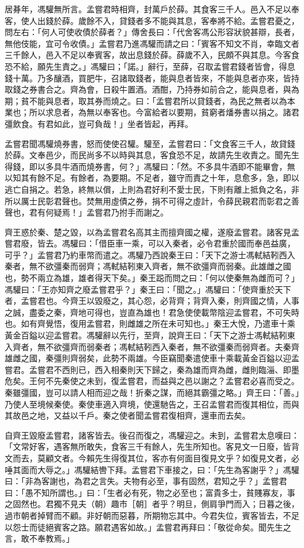 \begin{pinyinscope}
居朞年，馮驩無所言。孟嘗君時相齊，封萬戶於薛。其食客三千人。邑入不足以奉客，使人出錢於薛。歲餘不入，貸錢者多不能與其息，客奉將不給。孟嘗君憂之，問左右：「何人可使收債於薛者？」傳舍長曰：「代舍客馮公形容狀貌甚辯，長者，無他伎能，宜可令收債。」孟嘗君乃進馮驩而請之曰：「賓客不知文不肖，幸臨文者三千餘人，邑入不足以奉賓客，故出息錢於薛。薛歲不入，民頗不與其息。今客食恐不給，願先生責之。」馮驩曰；「諾。」辭行，至薛，召取孟嘗君錢者皆會，得息錢十萬。乃多釀酒，買肥牛，召諸取錢者，能與息者皆來，不能與息者亦來，皆持取錢之券書合之。齊為會，日殺牛置酒。酒酣，乃持券如前合之，能與息者，與為期；貧不能與息者，取其券而燒之。曰：「孟嘗君所以貸錢者，為民之無者以為本業也；所以求息者，為無以奉客也。今富給者以要期，貧窮者燔券書以捐之。諸君彊飲食。有君如此，豈可負哉！」坐者皆起，再拜。

孟嘗君聞馮驩燒券書，怒而使使召驩。驩至，孟嘗君曰：「文食客三千人，故貸錢於薛。文奉邑少，而民尚多不以時與其息，客食恐不足，故請先生收責之。聞先生得錢，即以多具牛酒而燒券書，何？」馮驩曰：「然。不多具牛酒即不能畢會，無以知其有餘不足。有餘者，為要期。不足者，雖守而責之十年，息愈多，急，即以逃亡自捐之。若急，終無以償，上則為君好利不愛士民，下則有離上抵負之名，非所以厲士民彰君聲也。焚無用虛債之券，捐不可得之虛計，令薛民親君而彰君之善聲也，君有何疑焉！」孟嘗君乃拊手而謝之。

齊王惑於秦、楚之毀，以為孟嘗君名高其主而擅齊國之權，遂廢孟嘗君。諸客見孟嘗君廢，皆去。馮驩曰：「借臣車一乘，可以入秦者，必令君重於國而奉邑益廣，可乎？」孟嘗君乃約車幣而遣之。馮驩乃西說秦王曰：「天下之游士馮軾結靷西入秦者，無不欲彊秦而弱齊；馮軾結靷東入齊者，無不欲彊齊而弱秦。此雄雌之國也，勢不兩立為雄，雄者得天下矣。」秦王跽而問之曰：「何以使秦無為雌而可？」馮驩曰：「王亦知齊之廢孟嘗君乎？」秦王曰：「聞之。」馮驩曰：「使齊重於天下者，孟嘗君也。今齊王以毀廢之，其心怨，必背齊；背齊入秦，則齊國之情，人事之誠，盡委之秦，齊地可得也，豈直為雄也！君急使使載幣陰迎孟嘗君，不可失時也。如有齊覺悟，復用孟嘗君，則雌雄之所在未可知也。」秦王大悅，乃遣車十乘黃金百鎰以迎孟嘗君。馮驩辭以先行，至齊，說齊王曰：「天下之游士馮軾結靷東入齊者，無不欲彊齊而弱秦者；馮軾結靷西入秦者，無不欲彊秦而弱齊者。夫秦齊雄雌之國，秦彊則齊弱矣，此勢不兩雄。今臣竊聞秦遣使車十乘載黃金百鎰以迎孟嘗君。孟嘗君不西則已，西入相秦則天下歸之，秦為雄而齊為雌，雌則臨淄、即墨危矣。王何不先秦使之未到，復孟嘗君，而益與之邑以謝之？孟嘗君必喜而受之。秦雖彊國，豈可以請人相而迎之哉！折秦之謀，而絕其霸彊之略。」齊王曰：「善。」乃使人至境候秦使。秦使車適入齊境，使還馳告之，王召孟嘗君而復其相位，而與其故邑之地，又益以千戶。秦之使者聞孟嘗君復相齊，還車而去矣。

自齊王毀廢孟嘗君，諸客皆去。後召而復之，馮驩迎之。未到，孟嘗君太息嘆曰：「文常好客，遇客無所敢失，食客三千有餘人，先生所知也。客見文一日廢，皆背文而去，莫顧文者。今賴先生得復其位，客亦有何面目復見文乎？如復見文者，必唾其面而大辱之。」馮驩結轡下拜。孟嘗君下車接之，曰：「先生為客謝乎？」馮驩曰：「非為客謝也，為君之言失。夫物有必至，事有固然，君知之乎？」孟嘗君曰：「愚不知所謂也。」曰：「生者必有死，物之必至也；富貴多士，貧賤寡友，事之固然也。君獨不見夫（朝）趣市［朝］者乎？明旦，側肩爭門而入；日暮之後，過市朝者掉臂而不顧。非好朝而惡暮，所期物忘其中。今君失位，賓客皆去，不足以怨士而徒絕賓客之路。願君遇客如故。」孟嘗君再拜曰：「敬從命矣。聞先生之言，敢不奉教焉。」


\end{pinyinscope}
